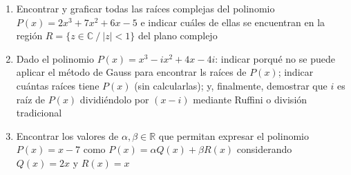 \documentclass[a4paper]{article}
\begin{document}
\begin{enumerate}
\begin{enumerate} [label=(\alph*)]
		\item Encontrar y graficar todas las raíces complejas del polinomio $P(x)=2x^3+7x^2+6x-5$ e indicar cuáles de ellas se encuentran en la región $R=\{ z \in \mathbb{C} ~/~ |z|<1 \}$ del plano complejo

		\item Dado el polinomio $P(x)=x^3-ix^2+4x-4i$: indicar porqué no se puede aplicar el método de Gauss para encontrar ls raíces de $P(x)$; indicar cuántas raíces tiene $P(x)$ (sin calcularlas); y, finalmente, demostrar que $i$ es raíz de $P(x)$ dividiéndolo por $(x-i)$ mediante Ruffini o división tradicional

		\item Encontrar los valores de $\alpha, \beta \in \mathbb{R}$ que permitan expresar el polinomio $P(x)=x-7$ como $P(x)=\alpha Q(x)+\beta R(x)$ considerando $Q(x)=2x$ y $R(x)=x$

	\end{enumerate}


\end{enumerate}
\end{document}
